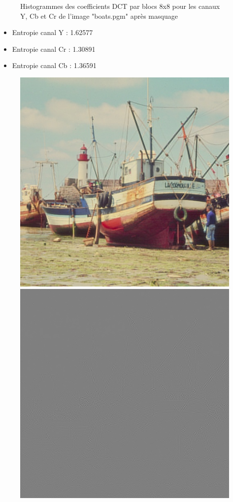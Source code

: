 \documentclass[12pt]{report}
\begin{document}
\begin{figure}[H]
\begin{center}
\caption{Histogrammes des coefficients DCT par blocs 8x8 pour les canaux Y, Cb et Cr de l'image "boats.pgm" après masquage}
\end{center}
\end{figure}

\begin{itemize}
\item Entropie canal Y : 1.62577
\item Entropie canal Cr : 1.30891
\item Entropie canal Cb : 1.36591
\end{itemize}

\begin{figure}[H]
\begin{center}
\includegraphics[scale=0.4]{../ImageRes/blockidct_masked_result.jpg} 
\includegraphics[scale=0.4]{../ImageRes/blockidct_masked_disto.jpg} 

\end{center}
\end{figure}
\end{document}
